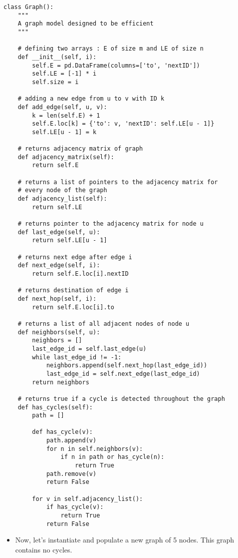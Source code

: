 \documentclass[11pt]{article}
\begin{document}
\begin{verbatim}
class Graph():
    """
    A graph model designed to be efficient
    """

    # defining two arrays : E of size m and LE of size n
    def __init__(self, i):
        self.E = pd.DataFrame(columns=['to', 'nextID'])
        self.LE = [-1] * i
        self.size = i

    # adding a new edge from u to v with ID k
    def add_edge(self, u, v):
        k = len(self.E) + 1
        self.E.loc[k] = {'to': v, 'nextID': self.LE[u - 1]}
        self.LE[u - 1] = k

    # returns adjacency matrix of graph
    def adjacency_matrix(self):
        return self.E

    # returns a list of pointers to the adjacency matrix for
    # every node of the graph
    def adjacency_list(self):
        return self.LE

    # returns pointer to the adjacency matrix for node u
    def last_edge(self, u):
        return self.LE[u - 1]

    # returns next edge after edge i
    def next_edge(self, i):
        return self.E.loc[i].nextID

    # returns destination of edge i
    def next_hop(self, i):
        return self.E.loc[i].to

    # returns a list of all adjacent nodes of node u
    def neighbors(self, u):
        neighbors = []
        last_edge_id = self.last_edge(u)
        while last_edge_id != -1:
            neighbors.append(self.next_hop(last_edge_id))
            last_edge_id = self.next_edge(last_edge_id)
        return neighbors

    # returns true if a cycle is detected throughout the graph
    def has_cycles(self):
        path = []

        def has_cycle(v):
            path.append(v)
            for n in self.neighbors(v):
                if n in path or has_cycle(n):
                    return True
            path.remove(v)
            return False

        for v in self.adjacency_list():
            if has_cycle(v):
                return True
            return False
\end{verbatim}

\begin{itemize}
\item Now, let's instantiate and populate a new graph of 5 nodes. This graph
contains no cycles.
\end{itemize}
\end{document}
